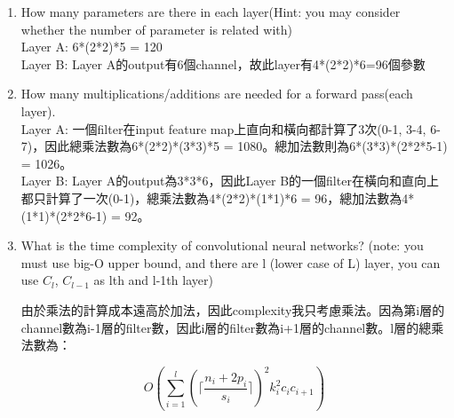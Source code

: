 \documentclass{article}
\begin{document}
\begin{enumerate}[label=(\alph*)]
\item How many parameters are there in each layer(Hint: you may consider whether the number of parameter is related with)\\
Layer A: 6*(2*2)*5 = 120\\
Layer B: Layer A的output有6個channel，故此layer有4*(2*2)*6=96個參數

\item How many multiplications/additions are needed for a forward pass(each layer).\\
Layer A: 一個filter在input feature map上直向和橫向都計算了3次(0-1, 3-4, 6-7)，因此總乘法數為6*(2*2)*(3*3)*5 = 1080。總加法數則為6*(3*3)*(2*2*5-1) = 1026。\\
Layer B: Layer A的output為3*3*6，因此Layer B的一個filter在橫向和直向上都只計算了一次(0-1)，總乘法數為4*(2*2)*(1*1)*6 = 96，總加法數為4*(1*1)*(2*2*6-1) = 92。

\item  What is the time complexity of convolutional neural networks? (​note: you must use big-O upper bound, and there are l (lower case of L) layer, you can use $C_l$,
$C_{l−1}$ as lth and l-1th layer)

由於乘法的計算成本遠高於加法，因此complexity我只考慮乘法。因為第i層的channel數為i-1層的filter數，因此i層的filter數為i+1層的channel數。l層的總乘法數為：

\begin{equation}
O\left(\sum_{i=1}^{l}\left(\lceil\frac{n_i+2p_i}{s_i}\rceil\right)^2 k_i^2 c_i c_{i+1}\right)
\end{equation}

\end{enumerate}
\end{document}
